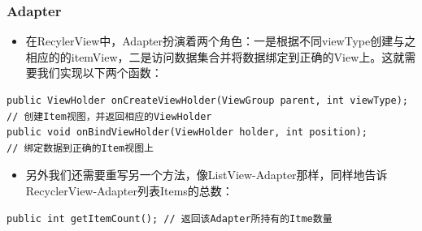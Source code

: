 \documentclass[9pt, b5paper]{article}
\begin{document}
\subsubsection{Adapter}
\label{sec-5-3-1}
\begin{itemize}
\item 在RecylerView中，Adapter扮演着两个角色：一是根据不同viewType创建与之相应的的itemView，二是访问数据集合并将数据绑定到正确的View上。这就需要我们实现以下两个函数：
\end{itemize}
\begin{verbatim}
public ViewHolder onCreateViewHolder(ViewGroup parent, int viewType); // 创建Item视图，并返回相应的ViewHolder
public void onBindViewHolder(ViewHolder holder, int position);        // 绑定数据到正确的Item视图上
\end{verbatim}
\begin{itemize}
\item 另外我们还需要重写另一个方法，像ListView-Adapter那样，同样地告诉RecyclerView-Adapter列表Items的总数：
\end{itemize}
\begin{verbatim}
public int getItemCount(); // 返回该Adapter所持有的Itme数量
\end{verbatim}
\end{document}
